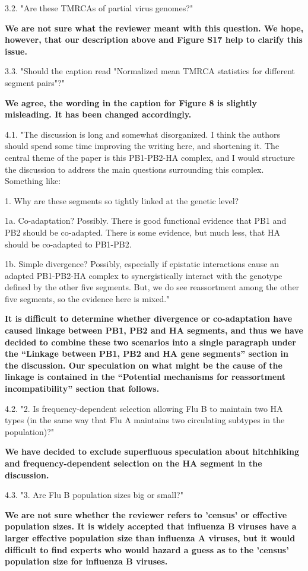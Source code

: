 \documentclass[11pt,oneside,letterpaper]{article}
\begin{document}
3.2. "Are these TMRCAs of partial virus genomes?"

\textbf{We are not sure what the reviewer meant with this question.
We hope, however, that our description above and Figure S17 help to clarify this issue.}

3.3. "Should the caption read "Normalized mean TMRCA statistics for different segment pairs"?"

\textbf{We agree, the wording in the caption for Figure 8 is slightly misleading. It has been changed accordingly.}

4.1. "The discussion is long and somewhat disorganized.
I think the authors should spend some time improving the writing here, and shortening it.
The central theme of the paper is this PB1-PB2-HA complex, and I would structure the discussion to address the main questions surrounding this complex.  
Something like:

1.  Why are these segments so tightly linked at the genetic level?

1a.  Co-adaptation?
Possibly.
There is good functional evidence that PB1 and PB2 should be co-adapted.
There is some evidence, but much less, that HA should be co-adapted to PB1-PB2.

1b.  Simple divergence?
Possibly, especially if epistatic interactions cause an adapted PB1-PB2-HA complex to synergistically interact with the genotype defined by the other five segments.
But, we do see reassortment among the other five segments, so the evidence here is mixed."

\textbf{It is difficult to determine whether divergence or co-adaptation have caused linkage between PB1, PB2 and HA segments, and thus we have decided to combine these two scenarios into a single paragraph under the ``Linkage between PB1, PB2 and HA gene segments'' section in the discussion.
Our speculation on what might be the cause of the linkage is contained in the ``Potential mechanisms for reassortment incompatibility'' section that follows.}

4.2. "2. Is frequency-dependent selection allowing Flu B to maintain two HA types (in the same way that Flu A maintains two circulating subtypes in the population)?"

\textbf{We have decided to exclude superfluous speculation about hitchhiking and frequency-dependent selection on the HA segment in the discussion.}

4.3. "3. Are Flu B population sizes big or small?"

\textbf{We are not sure whether the reviewer refers to 'census' or effective population sizes.
It is widely accepted that influenza B viruses have a larger effective population size than influenza A viruses, but it would difficult to find experts who would hazard a guess as to the 'census' population size for influenza B viruses.}
\end{document}
